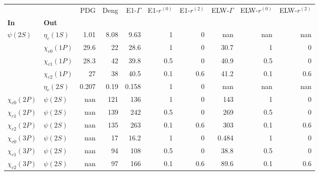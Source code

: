 \begin{tabular}{l|l|r|r|r|r|r|r|r|r}
\toprule
                &            &   PDG &  Deng &  E1-$\Gamma$ &  E1-$r^{(0)}$ &  E1-$r^{(2)}$ &  ELW-$\Gamma$ &  ELW-$r^{(0)}$ &  ELW-$r^{(2)}$ \\
\textbf{In} & \textbf{Out} &       &       &              &               &               &               &                &                \\
\midrule
\textbf{$\psi(2S)$} & \textbf{$\eta_{c}(1S)$} &  1.01 &  8.08 &         9.63 &             1 &             0 &           nan &            nan &            nan \\
                & \textbf{$\chi_{c0}(1P)$} &  29.6 &    22 &         28.6 &             1 &             0 &          30.7 &              1 &              0 \\
                & \textbf{$\chi_{c1}(1P)$} &  28.3 &    42 &         39.8 &           0.5 &             0 &          40.9 &            0.5 &              0 \\
                & \textbf{$\chi_{c2}(1P)$} &    27 &    38 &         40.5 &           0.1 &           0.6 &          41.2 &            0.1 &            0.6 \\
                & \textbf{$\eta_{c}(2S)$} & 0.207 &  0.19 &        0.158 &             1 &             0 &           nan &            nan &            nan \\
\textbf{$\chi_{c0}(2P)$} & \textbf{$\psi(2S)$} &   nan &   121 &          136 &             1 &             0 &           143 &              1 &              0 \\
\textbf{$\chi_{c1}(2P)$} & \textbf{$\psi(2S)$} &   nan &   139 &          242 &           0.5 &             0 &           269 &            0.5 &              0 \\
\textbf{$\chi_{c2}(2P)$} & \textbf{$\psi(2S)$} &   nan &   135 &          263 &           0.1 &           0.6 &           303 &            0.1 &            0.6 \\
\textbf{$\chi_{c0}(3P)$} & \textbf{$\psi(2S)$} &   nan &    17 &         16.2 &             1 &             0 &         0.484 &              1 &              0 \\
\textbf{$\chi_{c1}(3P)$} & \textbf{$\psi(2S)$} &   nan &    94 &          108 &           0.5 &             0 &          38.8 &            0.5 &              0 \\
\textbf{$\chi_{c2}(3P)$} & \textbf{$\psi(2S)$} &   nan &    97 &          166 &           0.1 &           0.6 &          89.6 &            0.1 &            0.6 \\
\bottomrule
\end{tabular}
